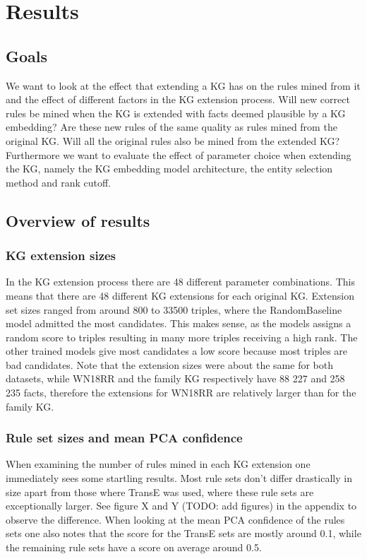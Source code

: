 \chapter{Results}

\section{Goals}
We want to look at the effect that extending a KG has on the rules mined from it and the effect of different factors in the KG extension process. Will new correct rules be mined when the KG is extended with facts deemed plausible by a KG embedding? Are these new rules of the same quality as rules mined from the original KG. Will all the original rules also be mined from the extended KG? Furthermore we want to evaluate the effect of parameter choice when extending the KG, namely the KG embedding model architecture, the entity selection method and rank cutoff.

\section{Overview of results}

\subsection{KG extension sizes}
In the KG extension process there are 48 different parameter combinations. This means that there are 48 different KG extensions for each original KG. Extension set sizes ranged from around 800 to 33500 triples, where the RandomBaseline model admitted the most candidates. This makes sense, as the models assigns a random score to triples resulting in many more triples receiving a high rank. The other trained models give most candidates a low score because most triples are bad candidates. Note that the extension sizes were about the same for both datasets, while WN18RR and the family KG respectively have 88 227 and 258 235 facts, therefore the extensions for WN18RR are relatively larger than for the family KG.

\subsection{Rule set sizes and mean PCA confidence}
\label{TransE_sucks} 
When examining the number of rules mined in each KG extension one immediately sees some startling results. Most rule sets don't differ drastically in size apart from those where TransE was used, where these rule sets are exceptionally larger. See figure X and Y (TODO: add figures) in the appendix to observe the difference. When looking at the mean PCA confidence of the rules sets one also notes that the score for the TransE sets are mostly around 0.1, while the remaining rule sets have a score on average around 0.5.

